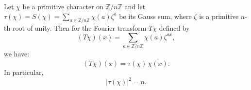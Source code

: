 Let $\chi$ be a primitive character on $\mathbb{Z}/n\mathbb{Z}$ and let $\tau(\chi) = S(\chi) = \sum_{a \in \mathbb{Z}/n\mathbb{Z}} \chi(a) \zeta^a$ be its Gauss sum, where $\zeta$ is a primitive $n$-th root of unity. Then for the Fourier transform $T\chi$ defined by
$$(T\chi)(x) = \sum_{a \in \mathbb{Z}/n\mathbb{Z}} \chi(a) \zeta^{ax},$$
we have:
$$(T\chi)(x) = \tau(\chi) \, \overline{\chi(x)}.$$
In particular,
$$|\tau(\chi)|^2 = n.$$
